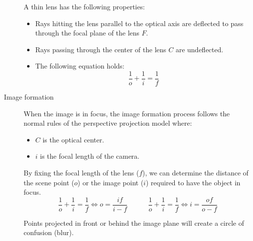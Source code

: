 \begin{description}
        A thin lens has the following properties:
        \begin{itemize}
            \item Rays hitting the lens parallel to the optical axis are deflected to pass through the focal plane of the lens $F$.
            \item Rays passing through the center of the lens $C$ are undeflected.
            \item The following equation holds: 
                \[ \frac{1}{o} + \frac{1}{i} = \frac{1}{f} \] 
        \end{itemize}

    \item[Image formation]
        When the image is in focus, the image formation process follows the normal rules of the perspective projection model where:
        \begin{itemize}
            \item $C$ is the optical center.
            \item $i$ is the focal length of the camera.
        \end{itemize}

        By fixing the focal length of the lens ($f$),
        we can determine the distance of the scene point ($o$) or the image point ($i$) required to have the object in focus.
        \[ \frac{1}{o}+\frac{1}{i} = \frac{1}{f} \iff o = \frac{if}{i - f} \hspace{3em} \frac{1}{o}+\frac{1}{i} = \frac{1}{f} \iff i = \frac{of}{o - f} \]

        \begin{remark}
            Points projected in front or behind the image plane will create a circle of confusion (blur).


\end{remark}
\end{description}
